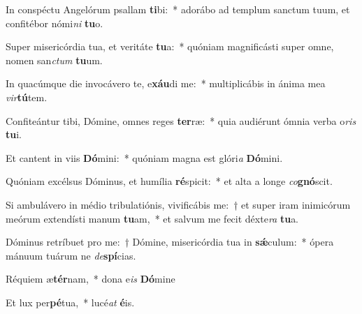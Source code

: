 ﻿\item In conspéctu Angelórum psallam \textbf{ti}bi:~* adorábo ad templum sanctum tuum, et confitébor nómi\textit{ni} \textbf{tu}o.

\item Super misericórdia tua, et veritáte \textbf{tu}a:~* quóniam magnificásti super omne, nomen san\textit{ctum} \textbf{tu}um.

\item In quacúmque die invocávero te, e\textbf{xáu}di me:~* multiplicábis in ánima mea \textit{vir}\textbf{tú}tem.

\item Confiteántur tibi, Dómine, omnes reges \textbf{ter}ræ:~* quia audiérunt ómnia verba o\textit{ris} \textbf{tu}i.

\item Et cantent in viis \textbf{Dó}mini:~* quóniam magna est glóri\textit{a} \textbf{Dó}mini.

\item Quóniam excélsus Dóminus, et humília \textbf{ré}spicit:~* et alta a longe \textit{co}\textbf{gnó}scit.

\item Si ambulávero in médio tribulatiónis, vivificábis me:~† et super iram inimicórum meórum extendísti manum \textbf{tu}am,~* et salvum me fecit déxte\textit{ra} \textbf{tu}a.

\item Dóminus retríbuet pro me:~† Dómine, misericórdia tua in \textbf{sǽ}culum:~* ópera mánuum tuárum ne \textit{de}\textbf{spí}cias.

\item Réquiem æ\textbf{tér}nam,~* dona e\textit{is} \textbf{Dó}mine

\item Et lux per\textbf{pé}tua,~* lucé\textit{at} \textbf{é}is.

